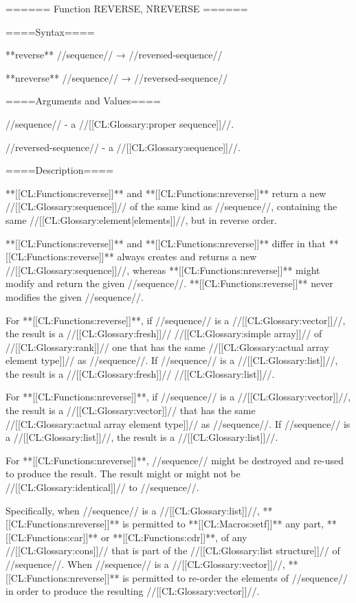====== Function REVERSE, NREVERSE ======

====Syntax====

**reverse** //sequence// → //reversed-sequence//

**nreverse** //sequence// → //reversed-sequence//

====Arguments and Values====

//sequence// - a //[[CL:Glossary:proper sequence]]//.

//reversed-sequence// - a //[[CL:Glossary:sequence]]//.

====Description====

**[[CL:Functions:reverse]]** and **[[CL:Functions:nreverse]]** return a new //[[CL:Glossary:sequence]]// of the same kind as //sequence//, containing the same //[[CL:Glossary:element|elements]]//, but in reverse order.

**[[CL:Functions:reverse]]** and **[[CL:Functions:nreverse]]** differ in that **[[CL:Functions:reverse]]** always creates and returns a new //[[CL:Glossary:sequence]]//, whereas **[[CL:Functions:nreverse]]** might modify and return the given //sequence//. **[[CL:Functions:reverse]]** never modifies the given //sequence//.

For **[[CL:Functions:reverse]]**, if //sequence// is a //[[CL:Glossary:vector]]//, the result is a //[[CL:Glossary:fresh]]// //[[CL:Glossary:simple array]]// of //[[CL:Glossary:rank]]// one that has the same //[[CL:Glossary:actual array element type]]// as //sequence//. If //sequence// is a //[[CL:Glossary:list]]//, the result is a //[[CL:Glossary:fresh]]// //[[CL:Glossary:list]]//.

For **[[CL:Functions:nreverse]]**, if //sequence// is a //[[CL:Glossary:vector]]//, the result is a //[[CL:Glossary:vector]]// that has the same //[[CL:Glossary:actual array element type]]// as //sequence//. If //sequence// is a //[[CL:Glossary:list]]//, the result is a //[[CL:Glossary:list]]//.

For **[[CL:Functions:nreverse]]**, //sequence// might be destroyed and re-used to produce the result. The result might or might not be //[[CL:Glossary:identical]]// to //sequence//.

Specifically, when //sequence// is a //[[CL:Glossary:list]]//, **[[CL:Functions:nreverse]]** is permitted to **[[CL:Macros:setf]]** any part, **[[CL:Functions:car]]** or **[[CL:Functions:cdr]]**, of any //[[CL:Glossary:cons]]// that is part of the //[[CL:Glossary:list structure]]// of //sequence//. When //sequence// is a //[[CL:Glossary:vector]]//, **[[CL:Functions:nreverse]]** is permitted to re-order the elements of //sequence// in order to produce the resulting //[[CL:Glossary:vector]]//.

